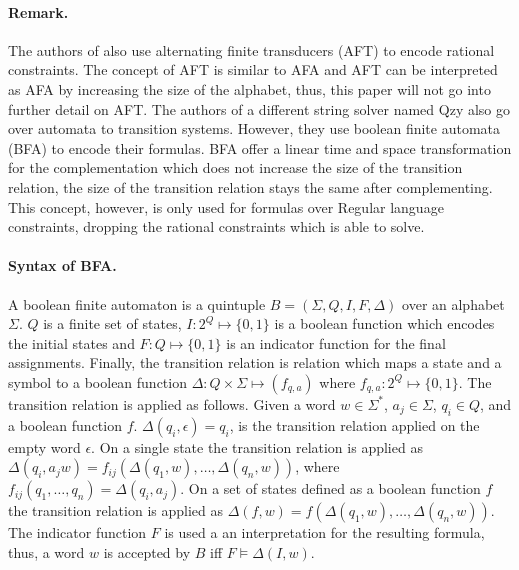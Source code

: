 \paragraph*{Remark.} The authors of \sloth also use alternating finite transducers (AFT) to encode rational constraints. The concept of AFT is similar to AFA and AFT can be interpreted as AFA by increasing the size of the alphabet, thus, this paper will not go into further detail on AFT.
The authors of a different string solver named Qzy \cite{??} also go over automata to transition systems.
However, they use boolean finite automata (BFA) to encode their formulas.
BFA offer a linear time and space transformation for the complementation which does not increase the size of the transition relation, the size of the transition relation stays the same after complementing.
This concept, however, is only used for formulas over Regular language constraints, dropping the rational constraints which \sloth is able to solve.
\paragraph{Syntax of BFA.} A boolean finite automaton is a quintuple $B = (\Sigma, Q, I , F, \Delta)$ over an alphabet $\Sigma$. \cite{succinct rep of reg lang by boolean automata}
$Q$ is a finite set of states, $I: 2^Q \mapsto \{0,1\}$ is a boolean function which encodes the initial states and $F: Q \mapsto \{0,1\}$ is an indicator function for the final assignments.
Finally, the transition relation is relation which maps a state and a symbol to a boolean function $\Delta: Q \times \Sigma \mapsto (f_{q,a})$ where $f_{q,a}: 2^Q \mapsto \{0,1\}$.
The transition relation is applied as follows.
Given a word $w \in \Sigma^*$, $a_j \in \Sigma$, $q_i \in Q$, and a boolean function $f$.
$\Delta(q_i, \epsilon) = q_i$, is the transition relation applied on the empty word $\epsilon$.
On a single state the transition relation is applied as $\Delta(q_i, a_jw) = f_{ij}(\Delta(q_1,w),\dots, \Delta(q_n, w))$, where $f_{ij}(q_1,\dots,q_n) = \Delta(q_i,a_j)$.
On a set of states defined as a boolean function $f$ the transition relation is applied as $\Delta(f,w) = f(\Delta(q_1,w), \dots, \Delta(q_n,w))$.
The indicator function $F$ is used a an interpretation for the resulting formula, thus, a word $w$ is accepted by $B$ iff $F \vDash \Delta(I,w)$.

